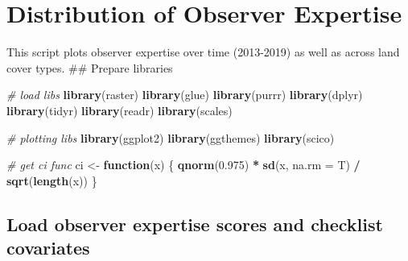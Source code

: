 \documentclass[]{article}
\newenvironment{Shaded}{\begin{snugshade}}{\end{snugshade}}
\newcommand{\CommentTok}[1]{\textcolor[rgb]{0.56,0.35,0.01}{\textit{#1}}}
\newcommand{\ControlFlowTok}[1]{\textcolor[rgb]{0.13,0.29,0.53}{\textbf{#1}}}
\newcommand{\DataTypeTok}[1]{\textcolor[rgb]{0.13,0.29,0.53}{#1}}
\newcommand{\FloatTok}[1]{\textcolor[rgb]{0.00,0.00,0.81}{#1}}
\newcommand{\KeywordTok}[1]{\textcolor[rgb]{0.13,0.29,0.53}{\textbf{#1}}}
\newcommand{\NormalTok}[1]{#1}
\newcommand{\OperatorTok}[1]{\textcolor[rgb]{0.81,0.36,0.00}{\textbf{#1}}}
\newcommand{\StringTok}[1]{\textcolor[rgb]{0.31,0.60,0.02}{#1}}
\begin{document}
\hypertarget{distribution-of-observer-expertise}{%
\section{Distribution of Observer Expertise}\label{distribution-of-observer-expertise}}

This script plots observer expertise over time (2013-2019) as well as across land cover types.
\#\# Prepare libraries

\begin{Shaded}
\begin{Highlighting}[numbers=left,,]
\CommentTok{# load libs}
\KeywordTok{library}\NormalTok{(raster)}
\KeywordTok{library}\NormalTok{(glue)}
\KeywordTok{library}\NormalTok{(purrr)}
\KeywordTok{library}\NormalTok{(dplyr)}
\KeywordTok{library}\NormalTok{(tidyr)}
\KeywordTok{library}\NormalTok{(readr)}
\KeywordTok{library}\NormalTok{(scales)}

\CommentTok{# plotting libs}
\KeywordTok{library}\NormalTok{(ggplot2)}
\KeywordTok{library}\NormalTok{(ggthemes)}
\KeywordTok{library}\NormalTok{(scico)}

\CommentTok{# get ci func}
\NormalTok{ci <-}\StringTok{ }\ControlFlowTok{function}\NormalTok{(x) \{}
  \KeywordTok{qnorm}\NormalTok{(}\FloatTok{0.975}\NormalTok{) }\OperatorTok{*}\StringTok{ }\KeywordTok{sd}\NormalTok{(x, }\DataTypeTok{na.rm =}\NormalTok{ T) }\OperatorTok{/}\StringTok{ }\KeywordTok{sqrt}\NormalTok{(}\KeywordTok{length}\NormalTok{(x))}
\NormalTok{\}}
\end{Highlighting}
\end{Shaded}

\hypertarget{load-observer-expertise-scores-and-checklist-covariates}{%
\subsection{Load observer expertise scores and checklist covariates}\label{load-observer-expertise-scores-and-checklist-covariates}}

\begin{Shaded}
\end{Shaded}
\end{document}

